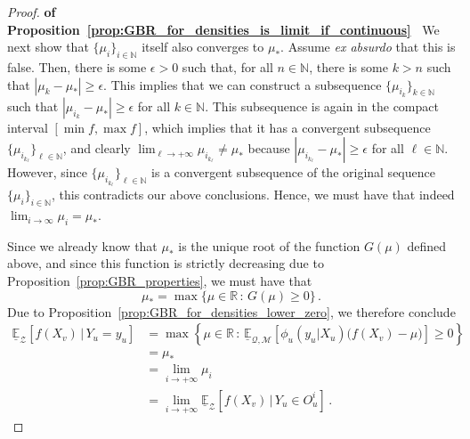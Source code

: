 \documentclass[twoside,11pt]{article}
\newcommand{\nats}{\mathbb{N}}
\newcommand{\reals}{\mathbb{R}}
\newcommand{\lexp}{\underline{\mathbb{E}}_{\rateset,\mathcal{M}}}
\newcommand{\rateset}{\mathcal{Q}}
\newcommand{\abs}[1]{\left\vert #1 \right\vert}
\begin{document}
\begin{proof}{\bf of Proposition~\ref{prop:GBR_for_densities_is_limit_if_continuous}~}
We next show that $\{\mu_i\}_{i\in\nats}$ itself also converges to $\mu_*$. Assume \emph{ex absurdo} that this is false. Then, there is some $\epsilon>0$ such that, for all $n\in\nats$, there is some $k>n$ such that $\abs{\mu_k - \mu_*} \geq \epsilon$. This implies that we can construct a subsequence $\{\mu_{i_k}\}_{k\in\nats}$ such that $\abs{\mu_{i_k}-\mu_*}\geq \epsilon$ for all $k\in\nats$. This subsequence is again in the compact interval $[\min f, \max f]$, which implies that it has a convergent subsequence $\{\mu_{i_{k_\ell}}\}_{\ell\in\nats}$, and clearly $\lim_{\ell\to+\infty}\mu_{i_{k_\ell}} \neq \mu_*$ because $\abs{\mu_{i_{k_\ell}} - \mu_*}\geq\epsilon$ for all $\ell\in\nats$. However, since $\{\mu_{i_{k_\ell}}\}_{\ell\in\nats}$ is a convergent subsequence of the original sequence $\{\mu_i\}_{i\in\nats}$, this contradicts our above conclusions. Hence, we must have that indeed $\lim_{i\to\infty}\mu_i=\mu_*$.

Since we already know that $\mu_*$ is the unique root of the function $G(\mu)$ defined above, and since this function is strictly decreasing due to Proposition~\ref{prop:GBR_properties}, we must have that
\begin{equation*}
\mu_* = \max\{\mu\in\reals\,:\, G(\mu)\geq 0\}\,.
\end{equation*}
Due to Proposition~\ref{prop:GBR_for_densities_lower_zero}, we therefore conclude
\begin{align*}
\underline{\mathbb{E}}_\mathcal{Z}[f(X_v)\,\vert\,Y_u=y_u] &= \max\left\{\mu\in\reals\,:\, \lexp\left[\phi_u(y_u\vert X_u)\bigl(f(X_v) - \mu\bigr)\right] \geq 0\right\} \\
 &= \mu_* \\
 &= \lim_{i\to+\infty} \mu_i \\
 &= \lim_{i\to+\infty} \underline{\mathbb{E}}_\mathcal{Z}[f(X_v)\,\vert\,Y_u\in O_u^i]\,.
\end{align*}
\end{proof}
\end{document}
